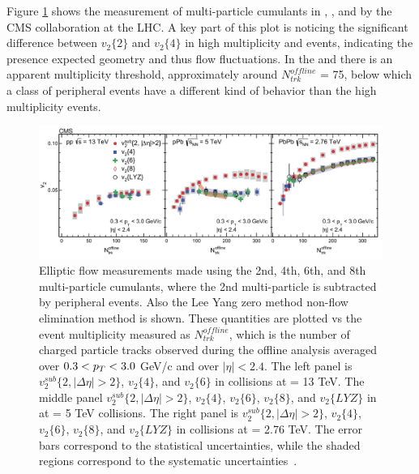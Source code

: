 Figure \ref{fig:pp_pPb_PbPb_cumulants} shows the measurement of multi-particle cumulants in \pp, \ppb, and \pbpb by the CMS collaboration at the LHC. A key part of this plot is noticing the significant difference between $v_2\{2\}$ and $v_2\{4\}$ in high multiplicity \ppb and \pbpb events, indicating the presence expected geometry and thus flow fluctuations. In the \ppb and \pbpb there is an apparent multiplicity threshold, approximately around $N^{offline}_{trk}$ = 75, below which a class of peripheral events have a different kind of behavior than the high multiplicity events. 
\begin{figure}[!ht]
\begin{center}
\includegraphics[width=0.95\linewidth]{figs/pp_pPb_PbPb_cumulants.PNG}
\caption{Elliptic flow measurements made using the 2nd, 4th, 6th, and 8th multi-particle cumulants, where the 2nd multi-particle is subtracted by peripheral events. Also the Lee Yang zero method non-flow elimination method is shown. These quantities are plotted vs the event multiplicity measured as $N^{offline}_{trk}$, which is the number of charged particle tracks observed during the offline analysis averaged over  $0.3 < \mbox{$p_T$} < 3.0$ GeV/c and over $|\eta| < 2.4$. The left panel is $v^{sub}_2\{2,|\Delta\eta|> 2\}$, $v_2\{4\}$, and $v_2\{6\}$ in \pp collisions at \sqs = 13 TeV. The middle panel $v^{sub}_2\{2,|\Delta\eta|> 2\}$, $v_2\{4\}$, $v_2\{6\}$, $v_2\{8\}$, and $v_2\{LYZ\}$ in \ppb at \sqsn = 5 TeV collisions. The right panel is  $v^{sub}_2\{2,|\Delta\eta|> 2\}$, $v_2\{4\}$, $v_2\{6\}$, $v_2\{8\}$, and $v_2\{LYZ\}$ in \pbpb collisions at \sqsn = 2.76 TeV. The error bars correspond to the statistical uncertainties, while the shaded regions correspond to the systematic uncertainties~\cite{Khachatryan2017193}.}
\label{fig:pp_pPb_PbPb_cumulants}
\end{center}
\end{figure}

